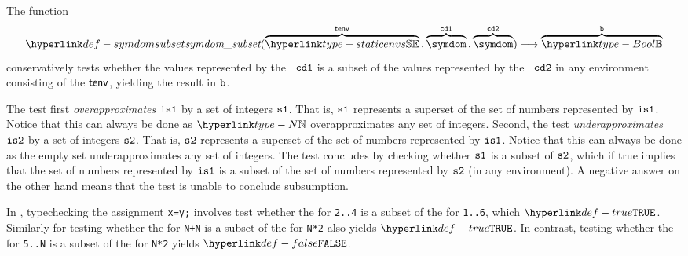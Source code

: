 \FormallyParagraph
{}

\hypertarget{def-symdomsubset}{}
The function
\[
  \symdomsubset(
    \overname{\staticenvs}{\tenv} \aslsep
    \overname{\symdom}{\cdone} \aslsep
    \overname{\symdom}{\cdtwo}
  ) \aslto
  \overname{\Bool}{\vb}
\]
conservatively tests whether the values represented by the \symbolicdomainterm\ $\texttt{cd1}$
is a subset of the values represented by the \symbolicdomainterm\ $\texttt{cd2}$ in any environment
consisting of the \staticenvironmentterm{} $\textsf{tenv}$, yielding the result in $\texttt{b}$.

The test first \emph{overapproximates} $\texttt{is1}$ by a set of integers $\texttt{s1}$.
That is, $\texttt{s1}$ represents a superset of the set of numbers represented by $\texttt{is1}$.
Notice that this can always be done as $\N$ overapproximates any set of integers.
%
Second, the test \emph{underapproximates} $\texttt{is2}$ by a set of integers $\texttt{s2}$.
That is, $\texttt{s2}$ represents a superset of the set of numbers represented by $\texttt{is1}$.
Notice that this can always be done as the empty set underapproximates any set of integers.
%
The test concludes by checking whether $\texttt{s1}$ is a subset of $\texttt{s2}$,
which if true implies that the set of numbers represented by $\texttt{is1}$ is a subset of the
set of numbers represented by $\texttt{s2}$ (in any environment).
A negative answer on the other hand means that the
test is unable to conclude subsumption.

In , typechecking the assignment \verb|x=y;|
involves test whether the \symbolicdomainterm{} for \verb|2..4| is a subset of the
\symbolicdomainterm{} for \verb|1..6|, which $\True$.
Similarly for testing whether the \symbolicdomainterm{} for \verb|N+N|
is a subset of the \symbolicdomainterm{} for \verb|N*2| also yields $\True$.
In contrast, testing whether the \symbolicdomainterm{} for \verb|5..N|
is a subset of the \symbolicdomainterm{} for \verb|N*2| yields $\False$.

